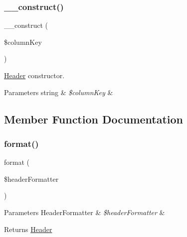 \subsubsection{\texorpdfstring{\+\_\+\+\_\+construct()}{\_\_construct()}}
{\footnotesize\ttfamily \+\_\+\+\_\+construct (\begin{DoxyParamCaption}\item[{string}]{\$column\+Key }\end{DoxyParamCaption})}

\hyperlink{classhamburgscleanest_1_1_data_tables_1_1_models_1_1_header}{Header} constructor. 
\begin{DoxyParams}[1]{Parameters}
string & {\em \$column\+Key} & \\
\hline
\end{DoxyParams}


\subsection{Member Function Documentation}
\mbox{\label{classhamburgscleanest_1_1_data_tables_1_1_models_1_1_header_a3d535bcef2cd83c8f69efd922b8ac939}} 
\subsubsection{\texorpdfstring{format()}{format()}}
{\footnotesize\ttfamily format (\begin{DoxyParamCaption}\item[{\hyperlink{interfacehamburgscleanest_1_1_data_tables_1_1_interfaces_1_1_header_formatter}{Header\+Formatter}}]{\$header\+Formatter }\end{DoxyParamCaption})}


\begin{DoxyParams}[1]{Parameters}
Header\+Formatter & {\em \$header\+Formatter} & \\
\hline
\end{DoxyParams}
\begin{DoxyReturn}{Returns}
\hyperlink{classhamburgscleanest_1_1_data_tables_1_1_models_1_1_header}{Header} 
\end{DoxyReturn}
\mbox{\label{classhamburgscleanest_1_1_data_tables_1_1_models_1_1_header_adbfe1566856df6d9c2570c9941a39db6}} 
